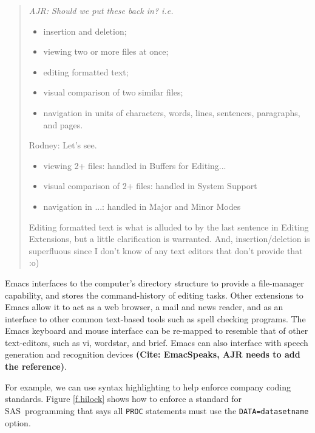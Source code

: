 \documentclass{article}
\newif\ifdraft
\newcommand*{\SAS}{\textsc{SAS}}
\newcommand{\stexttt}[1]{{\small\texttt{#1}}}
\newcommand{\emptyfig}{
\hspace*{42pt}\rule{324pt}{.25pt}\\
\hspace*{42pt}\rule{.25pt}{10pc}
\rule{316pt}{.25pt}
\rule{.25pt}{10pc}}
\newenvironment{Comment}{\begin{quote}\small\itshape }{\end{quote}}
\begin{document}
\begin{Comment}
  AJR: Should we put these back in? i.e.   
  \begin{itemize}
  \item insertion and deletion;
  \item viewing two or more files at once;
  \item editing formatted text;
  \item visual comparison of two similar files;
  \item navigation in units of characters, words, lines, sentences,
    paragraphs, and pages.
  \end{itemize}

Rodney:  Let's see. 
\begin{itemize}  
\item viewing 2+ files:  handled in Buffers for Editing...
\item visual comparison of 2+ files:  handled in System Support
\item navigation in ...:  handled in Major and Minor Modes
\end{itemize}
Editing formatted text is what is alluded to by the last sentence 
in Editing Extensions, but a little clarification is warranted.  And,
insertion/deletion is superfluous since I don't know of any text
editors that don't provide that :o)

\end{Comment}

Emacs interfaces to the computer's directory structure to provide a
file-manager capability, and stores the command-history of editing
tasks.  Other extensions to Emacs allow it to act as a web browser, a
mail and news reader, and as an interface to other common text-based
tools such as spell checking programs.  The Emacs keyboard and mouse
interface can be re-mapped to resemble that of other text-editors,
such as vi, wordstar, and brief.  Emacs can also interface with speech
generation and recognition devices \textbf{(Cite: EmacSpeaks, AJR
  needs to add the reference)}.

For example, we can use syntax highlighting to help enforce company
coding standards.  Figure \ref{f.hilock} shows how to enforce a
standard for \SAS\ programming that says all \stexttt{PROC} statements
must use the \stexttt{DATA=datasetname} option.

\end{document}
